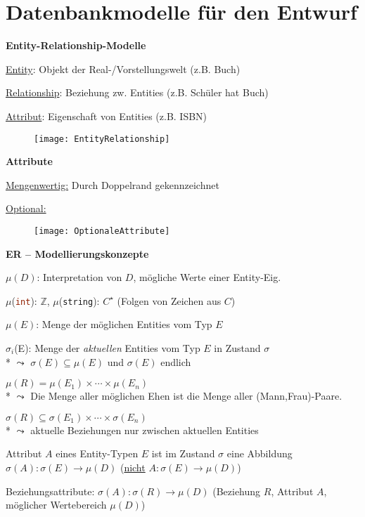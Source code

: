 \section{Datenbankmodelle für den Entwurf}
\label{sec:entwurf}

\textbf{Entity-Relationship-Modelle}
\begin{items}
	\item \underline{Entity}: Objekt der Real-/Vorstellungswelt (z.B. Buch)
	\item \underline{Relationship}: Beziehung zw. Entities (z.B. Schüler hat Buch)
	\item \underline{Attribut}: Eigenschaft von Entities (z.B. ISBN)
\end{items}
\begin{figure}[H]\centering\label{EntityRelationship}\texttt{[image: EntityRelationship]}\end{figure}

\textbf{Attribute}
\begin{items}
	\item \underline{Mengenwertig:} Durch Doppelrand gekennzeichnet
	\item \underline{Optional:}
	\begin{figure}[H]\centering\label{OptionaleAttribute}\texttt{[image: OptionaleAttribute]}\end{figure}
\end{items}

\textbf{ER -- Modellierungskonzepte}
\begin{items}
	\item \( \mu(D) \): Interpretation von \( D \), mögliche Werte einer Entity-Eig.
	\item \( \mu \)(\lstinline[language=sql]{int}): \( \mathbb{Z} \),  \( \mu \)(\lstinline[language=sql]{string}): \( C^\star \) (Folgen von Zeichen aus \( C \))
	\item \( \mu(E) \): Menge der möglichen Entities vom Typ \( E \)
	\item \( \sigma_i \)(E): Menge der \emph{aktuellen} Entities vom Typ \( E \) in Zustand \( \sigma\)
	\\* \( \leadsto \) \( \sigma(E) \subseteq \mu(E) \) und \( \sigma(E) \) endlich
	\item \( \mu(R) = \mu(E_1) \times \cdots \times \mu(E_n) \) \\* \( \leadsto \) Die Menge aller möglichen Ehen ist die Menge aller (Mann,Frau)-Paare.
	\item \( \sigma(R) \subseteq \sigma(E_1) \times \cdots \times \sigma(E_n) \) \\* \( \leadsto \) aktuelle Beziehungen nur zwischen aktuellen Entities
	\item Attribut \( A \) eines Entity-Typen \( E \) ist im Zustand \( \sigma \) eine Abbildung \( \sigma(A): \sigma(E) \to \mu(D) \) (\underline{nicht} \( A: \sigma(E) \to \mu(D) \))
	\item Beziehungsattribute: \( \sigma(A): \sigma(R) \to \mu(D) \) (Beziehung \( R \), Attribut \( A \), möglicher Wertebereich \( \mu(D) \))
\end{items}

